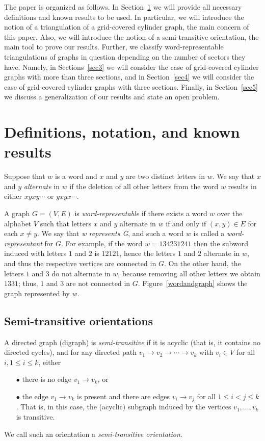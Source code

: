 \documentclass[12pt]{article}
\numberwithin{equation}{section}
\begin{document}
The paper is organized as follows. In Section~\ref{sec2} we will provide all necessary definitions and known results to be used. In particular, we will introduce the notion of a triangulation of a grid-covered cylinder graph, the main concern of this paper. Also, we will introduce the notion of a semi-transitive orientation, the main tool to prove our results. Further, we classify word-representable triangulations of graphs in question depending on the number of sectors they have. Namely, in Sections~\ref{sec3} we will consider the case of grid-covered cylinder graphs with more than three sections, and in Section~\ref{sec4} we will consider the case of grid-covered cylinder graphs with three sections. Finally, in Section~\ref{sec5} we discuss a generalization of our results and state an open problem.

\section{Definitions, notation, and known results}\label{sec2}

Suppose that $w$ is a word and $x$ and $y$ are two distinct letters in $w$.
We say that $x$ and $y$ {\it alternate} in $w$ if the deletion of all other
letters from the word $w$ results in either $xyxy\cdots$ or $yxyx\cdots$.

A graph $G=(V,E)$ is {\it word-representable} if there exists a word $w$ over
the alphabet $V$ such that letters $x$ and $y$ alternate in $w$ if and only if
$(x,y)\in E$ for each $x\neq y$. We say that {\it w represents G}, and such a word $w$
is called a {\it word-representant} for $G$.
For example, if the word $w=134231241$ then the subword induced with letters $1$ and $2$
is $12121$, hence the letters $1$ and $2$ alternate in $w$, and thus the respective vertices are connected in $G$. On the other hand, the letters $1$ and $3$
do not alternate in $w$, because removing all other letters we obtain $1331$; thus, $1$ and $3$ are not connected in $G$. Figure~\ref{wordandgraph} shows the graph represented by $w$.

\subsection{Semi-transitive orientations}

A directed graph (digraph) is {\it semi-transitive} if it is acyclic (that is, it contains no directed cycles), and
for any directed path $v_1\rightarrow v_2\rightarrow\cdots\rightarrow v_k$ with $v_i\in V$
for all $i, 1\leq i \leq k$, either
\begin{enumerate}
 \item[$\bullet$] there is no edge $v_1\rightarrow v_k$, or
 \item[$\bullet$] the edge $v_1\rightarrow v_k$ is present and there are edges $v_i\rightarrow v_j$ for all
     $1\leq i< j \leq k$. That is, in this case, the (acyclic) subgraph induced by the vertices
     $v_1,\ldots,v_k$ is transitive.
\end{enumerate}
We call such an orientation a {\em semi-transitive orientation}.
\end{document}
